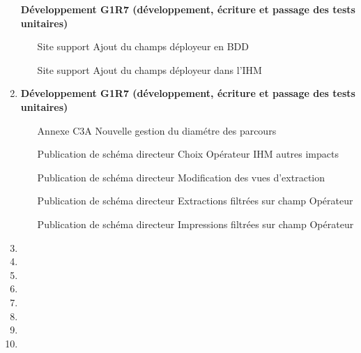 \begin{enumerate}[label= Semaine \no\textbf{\arabic*.},itemsep=20pt]
\begin{enumerate}[label = Correction \no\arabic*.,align=left]
\end{enumerate}
\textbf{Développement G1R7 (développement, écriture et passage des tests unitaires)}
\begin{enumerate}[label = Développement \no\arabic*.,align=left]
	\item [Site support] Ajout du champs déployeur en BDD
	\item [Site support] Ajout du champs déployeur dans l'IHM
\end{enumerate}
\item
\textbf{Développement G1R7 (développement, écriture et passage des tests unitaires)}
\begin{enumerate}[label = Développement \no\arabic*.,align=left]
	\item [Annexe C3A] Nouvelle gestion du diamétre des parcours
	\item [Publication de schéma directeur] Choix Opérateur IHM autres impacts
	\item [Publication de schéma directeur] Modification des vues d'extraction
	\item [Publication de schéma directeur] Extractions filtrées sur champ Opérateur
	\item [Publication de schéma directeur] Impressions filtrées sur champ Opérateur
\end{enumerate}


\item
\item
\item
\item
\item
\item
\item
\item
\end{enumerate}

